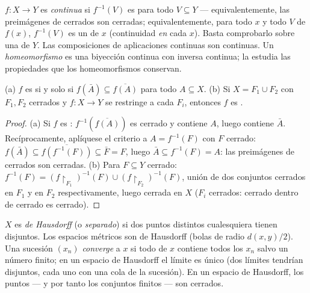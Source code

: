 \begin{definition}\label{def:b3:topology:continuity}
$f \colon X \to Y$ es \emph{continua} si
$f^{-1}(V)$ es  para todo  $V \subseteq Y$ ---
equivalentemente, las preimágenes de cerrados son cerradas;
equivalentemente, para todo $x$ y todo
 $V$ de $f(x)$, $f^{-1}(V)$ es
un  de $x$ (continuidad
\emph{en} cada $x$). Basta comprobarlo sobre una
 de $Y$. Las composiciones de
aplicaciones continuas son continuas. Un
\emph{homeomorfismo} es una biyección continua con
inversa continua; la 
estudia las propiedades que los homeomorfismos conservan.
\end{definition}

\begin{proposition}
\label{prop:b3:topology:gluing}
(a) $f$ es  si y solo si
$f(\bar A) \subseteq \overline{f(A)}$ para todo $A \subseteq X$. (b) Si
$X = F_1 \cup F_2$ con $F_1, F_2$ cerrados y $f\colon X
\to Y$ se restringe  a
cada $F_i$, entonces $f$ es
.
\end{proposition}

\begin{proof}
(a) Si $f$ es :
$f^{-1}(\overline{f(A)})$ es cerrado y contiene $A$, luego contiene
$\bar A$. Recíprocamente, aplíquese el criterio a $A = f^{-1}(F)$ con
$F$ cerrado: $f(\bar A) \subseteq
\overline{f(f^{-1}(F))} \subseteq \bar F = F$, luego $\bar A
\subseteq f^{-1}(F) = A$: las preimágenes de cerrados son cerradas. (b)
Para $F \subseteq Y$ cerrado: $f^{-1}(F) =
(f\restriction_{F_1})^{-1}(F) \cup (f\restriction_{F_2})^{-1}
(F)$, unión de dos conjuntos cerrados en $F_1$ y en $F_2$
respectivamente, luego cerrada en $X$ ($F_i$ cerrados: cerrado dentro de
cerrado es cerrado).
\end{proof}

\begin{definition}\label{def:b3:topology:hausdorff}
$X$ es \emph{de Hausdorff} (o
\emph{separado}) si dos puntos distintos cualesquiera tienen
 disjuntos. Los espacios
métricos son de Hausdorff (bolas de radio $d(x,y)/2$). Una sucesión
$(x_n)$ \emph{converge} a $x$ si todo
 de $x$ contiene todos los
$x_n$ salvo un número finito; en un espacio de Hausdorff el límite es
único (dos límites tendrían 
disjuntos, cada uno con una cola de la sucesión). En un espacio de
Hausdorff, los puntos --- y por tanto los conjuntos finitos --- son
cerrados.
\end{definition}


